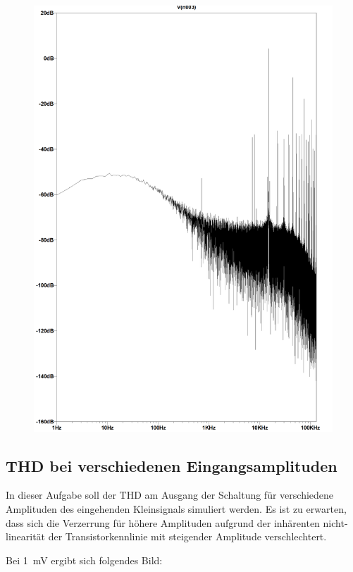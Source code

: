 \begin{figure}[H]
    \centering
    \includegraphics[width = \textwidth]{tex/1_Microphone/pictures/fft_output.png}
    \label{fig:my_label}
\end{figure}

\subsection{THD bei verschiedenen Eingangsamplituden}

In dieser Aufgabe soll der THD am Ausgang der Schaltung für verschiedene Amplituden des eingehenden Kleinsignals simuliert werden. Es ist zu erwarten, dass sich die Verzerrung für höhere Amplituden aufgrund der inhärenten nicht-linearität der Transistorkennlinie mit steigender Amplitude verschlechtert.

Bei \SI{1}{\milli \volt} ergibt sich folgendes Bild:

